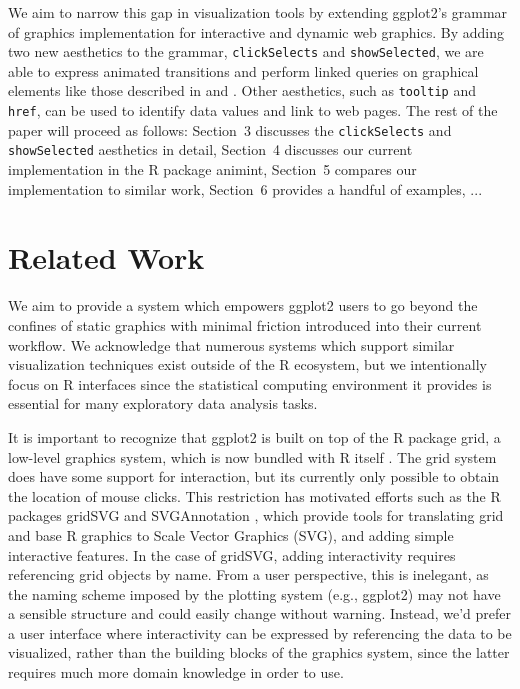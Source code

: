 \documentclass[journal]{vgtc}\usepackage[]{graphicx}\usepackage[]{color}
\begin{document}
We aim to narrow this gap in visualization tools by extending ggplot2's grammar of graphics implementation for interactive and dynamic web graphics. By adding two new aesthetics to the grammar, \texttt{clickSelects} and \texttt{showSelected}, we are able to express animated transitions and perform linked queries on graphical elements like those described in \citep{Ahlberg:1991} and \citep{Buja:1991vh}. Other aesthetics, such as \texttt{tooltip} and \texttt{href}, can be used to identify data values and link to web pages. The rest of the paper will proceed as follows: Section~3 discusses the \texttt{clickSelects} and \texttt{showSelected} aesthetics in detail, Section~4 discusses our current implementation in the R package animint, Section~5 compares our implementation to similar work, Section~6 provides a handful of examples, ...


\section{Related Work}

We aim to provide a system which empowers ggplot2 users to go beyond the confines of static graphics with minimal friction introduced into their current workflow. We acknowledge that numerous systems which support similar visualization techniques exist outside of the R ecosystem, but we intentionally focus on R interfaces since the statistical computing environment it provides is essential for many exploratory data analysis tasks.

It is important to recognize that ggplot2 is built on top of the R package grid, a low-level graphics system, which is now bundled with R itself \citep{RCore}. The grid system does have some support for interaction, but its currently only possible to obtain the location of mouse clicks. This restriction has motivated efforts such as the R packages gridSVG \citep{gridSVG} and SVGAnnotation \citep{SVGAnnotation}, which provide tools for translating grid and base R graphics to Scale Vector Graphics (SVG), and adding simple interactive features. In the case of gridSVG, adding interactivity requires referencing grid objects by name. From a user perspective, this is inelegant, as the naming scheme imposed by the plotting system (e.g., ggplot2) may not have a sensible structure and could easily change without warning. Instead, we'd prefer a user interface where interactivity can be expressed by referencing the data to be visualized, rather than the building blocks of the graphics system, since the latter requires much more domain knowledge in order to use.
\end{document}

